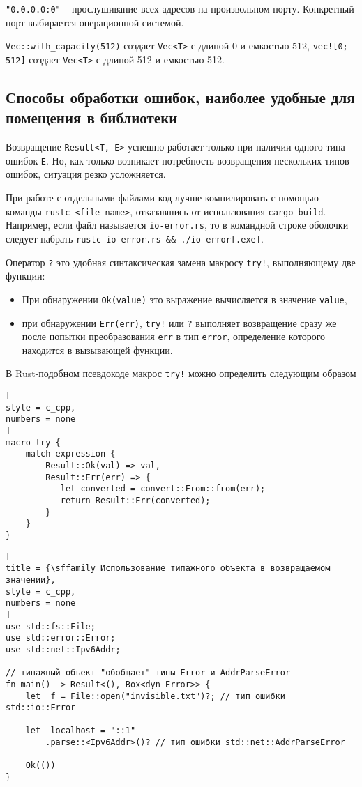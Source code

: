 \documentclass[%
	11pt,
	a4paper,
	utf8,
		]{article}
\begin{document}
\verb|"0.0.0.0:0"| -- прослушивание всех адресов на произвольном порту. Конкретный порт выбирается операционной системой.

\verb|Vec::with_capacity(512)| создает \verb|Vec<T>| {\color{red}с длиной 0} и емкостью 512, \verb|vec![0; 512]| создает \verb|Vec<T>| с длиной 512 и емкостью 512.

\subsection{Способы обработки ошибок, наиболее удобные для помещения в библиотеки}

Возвращение \verb|Result<T, E>| успешно работает только при наличии одного типа ошибок \verb|E|. Но, как только возникает потребность возвращения нескольких типов ошибок, ситуация резко усложняется.

{
При работе с отдельными файлами код лучше компилировать с помощью команды \verb|rustc <file_name>|, отказавшись от использования \verb|cargo build|. Например, если файл называется \verb|io-error.rs|, то в командной строке оболочки следует набрать \verb|rustc io-error.rs && ./io-error[.exe]|.
}

Оператор \verb|?| это удобная синтаксическая замена макросу \verb|try!|, выполняющему две функции:
\begin{itemize}
	\item При обнаружении \verb|Ok(value)| это выражение вычисляется в значение \verb|value|,
	
	\item при обнаружении \verb|Err(err)|, \verb|try!| или \verb|?| выполняет возвращение сразу же после попытки преобразования \verb|err| в тип \verb|error|, определение которого находится в вызывающей функции.
\end{itemize}

В Rust-подобном псевдокоде макрос \verb|try!| можно определить следующим образом
\begin{lstlisting}[
style = c_cpp,
numbers = none
]
macro try {
    match expression {
        Result::Ok(val) => val,
        Result::Err(err) => {
           let converted = convert::From::from(err);
           return Result::Err(converted);
        }
    }
}
\end{lstlisting}

\begin{lstlisting}[
title = {\sffamily Использование типажного объекта в возвращаемом значении},
style = c_cpp,
numbers = none
]
use std::fs::File;
use std::error::Error;
use std::net::Ipv6Addr;

// типажный объект "обобщает" типы Error и AddrParseError
fn main() -> Result<(), Box<dyn Error>> {
    let _f = File::open("invisible.txt")?; // тип ошибки std::io::Error
    
    let _localhost = "::1"
        .parse::<Ipv6Addr>()? // тип ошибки std::net::AddrParseError
        
    Ok(())
}
\end{lstlisting}
\end{document}
